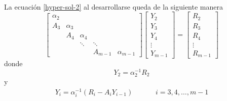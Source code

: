 \documentclass[letterpaper, openright, 12pt]{book}
\begin{document}
	\paragraph*{}
		La ecuación \ref{hyper-sol-2} al desarrollarse queda de la siguiente manera
		\begin{equation}
			\begin{bmatrix}
				\alpha_2\\
				A_3 & \alpha_3\\
				& A_4 & \alpha_4\\
				& & \ddots & \ddots\\
				& & & A_{m-1} & \alpha_{m-1}
			\end{bmatrix}
			\begin{bmatrix}
				Y_2\\
				Y_3\\
				Y_4\\
				\vdots\\
				Y_{m-1}
			\end{bmatrix}
			=
			\begin{bmatrix}
				R_2\\
				R_3\\
				R_4\\
				\vdots\\
				R_{m-1}
			\end{bmatrix}
		\end{equation}
		donde
		\begin{equation}
			Y_2 = \alpha_{2}^{-1} R_2
		\end{equation}
		y
		\begin{align}
			Y_i = \alpha_{i}^{-1} \left( R_i - A_i Y_{i-1} \right) &&&& i = 3, 4, \dots, m-1
		\end{align}
		
\end{document}
